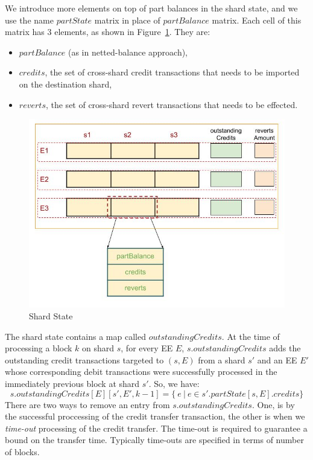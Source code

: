 \documentclass{article}
\begin{document}
We introduce more elements on top of part balances in the shard state, and we use the name $partState$ matrix in place of $partBalance$ matrix. Each cell of this matrix has 3 elements, as shown in Figure~\ref{fig:shardstate}. They are:
\begin{itemize}
	\item $partBalance$ (as in netted-balance approach),
	\item $credits$, the set of cross-shard credit transactions that needs to be imported on the destination shard,
	\item $reverts$, the set of cross-shard revert transactions that needs to be effected.
\end{itemize}

\begin{figure}[h]
	\includegraphics[scale=0.5]{state.jpg}
	\caption{Shard State\label{fig:shardstate}}
\end{figure}
	
The shard state contains a map called $outstandingCredits$. At the time of processing a block $k$ on shard $s$, for every EE $E$, $s.outstandingCredits$ adds the outstanding credit transactions targeted to $(s,E)$ from a shard $s'$ and an EE $E'$ whose corresponding debit transactions were successfully processed in the immediately previous block at shard $s'$. So, we have:
\[
	s.outstandingCredits[E][s', E', k-1] = \{~e ~|~ e \in s'.partState[s,E].credits\}
\]
There are two ways to remove an entry from $s.outstandingCredits$. One, is by the successful proccessing of the credit transfer transaction, the other is when we {\em time-out} processing of the credit transfer. The time-out is required to guarantee a bound on the transfer time. Typically time-outs are specified in terms of number of blocks.
\end{document}
